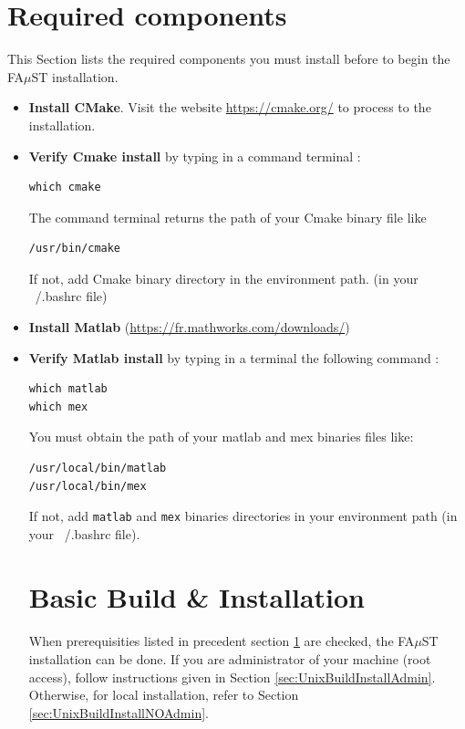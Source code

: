 \section{Required components}\label{sec:RequiredTools}
This Section lists the required components you must install before to begin the FA$\mu$ST installation. 
\begin{itemize}
\item \textbf{Install CMake}. Visit the website \url{https://cmake.org/} to process to the installation.
\item \textbf{Verify Cmake install} by typing in a command terminal : 
\begin{lstlisting}
which cmake
\end{lstlisting}
The command terminal returns the path of your Cmake binary file like
\begin{lstlisting}
/usr/bin/cmake
\end{lstlisting}
If not, add Cmake binary directory in the environment path. (in your ~/.bashrc file)

\item \textbf{Install Matlab} (\url{https://fr.mathworks.com/downloads/})

\item \textbf{Verify Matlab install} by typing in a terminal the following command : 
\begin{lstlisting}
which matlab
which mex
\end{lstlisting}
You must obtain the path of your matlab and mex binaries files like: 
\begin{lstlisting}
/usr/local/bin/matlab
/usr/local/bin/mex
\end{lstlisting}
If not, add \texttt{matlab} and \texttt{mex} binaries directories in your environment path (in your ~/.bashrc file). 





\section{Basic Build \& Installation}\label{sec:UnixBuildInstall}
\paragraph{}When prerequisities listed in precedent section \ref{sec:RequiredTools} are checked, the FA$\mu$ST installation can be done. If you are administrator of your machine (root access), follow instructions given in Section \ref{sec:UnixBuildInstallAdmin}. Otherwise, for local installation, refer to Section \ref{sec:UnixBuildInstallNOAdmin}. 


\end{itemize}
